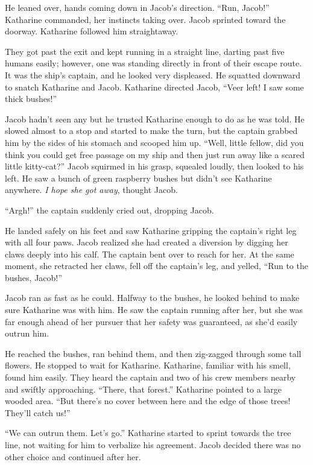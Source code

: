 He leaned over, hands coming down in Jacob's direction. “Run, Jacob!” Katharine commanded, her instincts taking over. Jacob sprinted toward the doorway. Katharine followed him straightaway.

They got past the exit and kept running in a straight line, darting past five humans easily; however, one was standing directly in front of their escape route. It was the ship's captain, and he looked very displeased. He squatted downward to snatch Katharine and Jacob. Katharine directed Jacob, “Veer left! I saw some thick bushes!”

Jacob hadn't seen any but he trusted Katharine enough to do as he was told. He slowed almost to a stop and started to make the turn, but the captain grabbed him by the sides of his stomach and scooped him up. “Well, little fellow, did you think you could get free passage on my ship and then just run away like a scared little kitty-cat?” Jacob squirmed in his grasp, squealed loudly, then looked to his left. He saw a bunch of green raspberry bushes but didn't see Katharine anywhere. \textit{I hope she got away}, thought Jacob.

“Argh!” the captain suddenly cried out, dropping Jacob.

He landed safely on his feet and saw Katharine gripping the captain's right leg with all four paws. Jacob realized she had created a diversion by digging her claws deeply into his calf. The captain bent over to reach for her. At the same moment, she retracted her claws, fell off the captain's leg, and yelled, “Run to the bushes, Jacob!”

Jacob ran as fast as he could. Halfway to the bushes, he looked behind to make sure Katharine was with him. He saw the captain running after her, but she was far enough ahead of her pursuer that her safety was guaranteed, as she'd easily outrun him. %

He reached the bushes, ran behind them, and then zig-zagged through some tall flowers. He stopped to wait for Katharine. Katharine, familiar with his smell, found him easily. They heard the captain and two of his crew members nearby and swiftly approaching. “There, that forest.” Katharine pointed to a large wooded area. “But there's no cover between here and the edge of those trees! They'll catch us!”

“We can outrun them. Let's go.” Katharine started to sprint towards the tree line, not waiting for him to verbalize his agreement. Jacob decided there was no other choice and continued after her.

